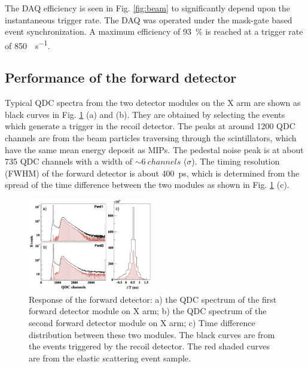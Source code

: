 \documentclass[number,5p]{elsarticle}
\begin{document}
The DAQ efficiency is seen in Fig. \ref{fig:beam} to significantly depend upon the
instantaneous trigger rate.
The DAQ was operated under the mask-gate based event synchronization.
A maximum efficiency of \SI{93}{\percent} is reached at a trigger rate of \SI{850}{\event\per\second}.

\subsection{Performance of the forward detector}
\label{sec:fwd_performance}

Typical QDC spectra from the two detector modules on the X arm are shown as
black curves in Fig. \ref{fig:fwd_performance} (a) and (b).
They are obtained by selecting the events which generate a trigger in the recoil detector.
The peaks at around \num{1200} QDC channels are from the beam particles
traversing through the scintillators, which have the same mean energy deposit as MIPs.
The pedestal noise peak is at about \num{735} QDC channels with a width of
$\sim\SI{6}{channels}$ ($\sigma$).
The timing resolution (FWHM) of the forward detector is about \SI{400}{ps}, which is determined from the spread of the time difference between the two modules as shown in Fig. \ref{fig:fwd_performance} (c).
\begin{figure}[h!]
  \centering
  \includegraphics[width=0.48\textwidth]{./fwd_performance_elastic.png}
  \caption{Response of the forward detector: a) the QDC spectrum of the first forward detector module on X arm;
    b) the QDC spectrum of the second forward detector module on X arm; c) Time
    difference distribution between these two modules.
    The black curves are from the events triggered by the recoil
    detector.
    The red shaded curves are from the elastic scattering event sample.
  }
  \label{fig:fwd_performance}
\end{figure}
\end{document}
